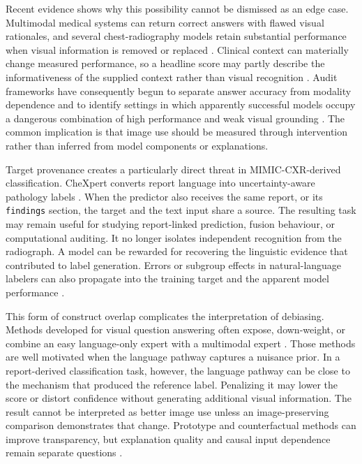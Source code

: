 \documentclass[10pt,a4paper,twocolumn]{article}
\begin{document}
Recent evidence shows why this possibility cannot be dismissed as an edge
case. Multimodal medical systems can return correct answers with flawed visual
rationales, and several chest-radiography models retain substantial performance
when visual information is removed or replaced
\cite{jin2024hiddenflaws,lotfinia2026needimage}. Clinical context can materially
change measured performance, so a headline score may partly describe the
informativeness of the supplied context rather than visual recognition
\cite{wang2026clinicalcontext}. Audit frameworks have consequently begun to
separate answer accuracy from modality dependence and to identify settings in
which apparently successful models occupy a dangerous combination of high
performance and weak visual grounding
\cite{sadanandan2026consistentdangerous}. The common implication is that image
use should be measured through intervention rather than inferred from model
components or explanations.

Target provenance creates a particularly direct threat in MIMIC-CXR-derived
classification. CheXpert converts report language into uncertainty-aware
pathology labels \cite{irvin2019chexpert}. When the predictor also receives the
same report, or its \texttt{findings} section, the target and the text input
share a source. The resulting task may remain useful for studying report-linked
prediction, fusion behaviour, or computational auditing. It no longer isolates
independent recognition from the radiograph. A model can be rewarded for
recovering the linguistic evidence that contributed to label generation. Errors
or subgroup effects in natural-language labelers can also propagate into the
training target and the apparent model performance
\cite{sabottke2024targetselection,santomartino2024nlplabeling}.

This form of construct overlap complicates the interpretation of debiasing.
Methods developed for visual question answering often expose, down-weight, or
combine an easy language-only expert with a multimodal expert
\cite{agrawal2018dontassume,clark2019easyway,cadene2019rubi}. Those methods are
well motivated when the language pathway captures a nuisance prior. In a
report-derived classification task, however, the language pathway can be close
to the mechanism that produced the reference label. Penalizing it may lower the
score or distort confidence without generating additional visual information.
The result cannot be interpreted as better image use unless an image-preserving
comparison demonstrates that change. Prototype and counterfactual methods can
improve transparency, but explanation quality and causal input dependence
remain separate questions \cite{chiang2026cxrnexus}.
\end{document}
